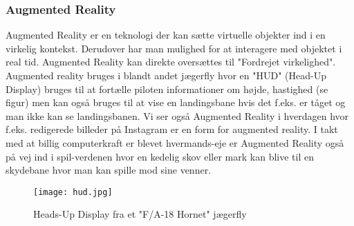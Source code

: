 \subsubsection{Augmented Reality}
Augmented Reality er en teknologi der kan sætte virtuelle objekter ind i en virkelig kontekst. Derudover har man mulighed for at interagere med objektet i real tid.
Augmented Reality kan direkte oversættes til "Fordrejet virkelighed". Augmented reality bruges i blandt andet jægerfly \cite{hud} hvor en "HUD" (Head-Up Display) bruges til at fortælle piloten informationer om højde, hastighed (se figur) men kan også bruges til at vise en landingsbane hvis det f.eks. er tåget og man ikke kan se landingsbanen. 
Vi ser også Augmented Reality i hverdagen hvor f.eks. redigerede billeder på Instagram er en form for augmented reality. I takt med at billig computerkraft er blevet hvermands-eje er Augmented Reality også på vej ind i spil-verdenen hvor en kedelig skov eller mark kan blive til en skydebane hvor man kan spille mod sine venner.

\begin{figure}[H]
    \centering
    \texttt{[image: hud.jpg]}
    \caption{Heads-Up Display fra et "F/A-18 Hornet" jægerfly}
    \label{fig:hud}
\end{figure} 
